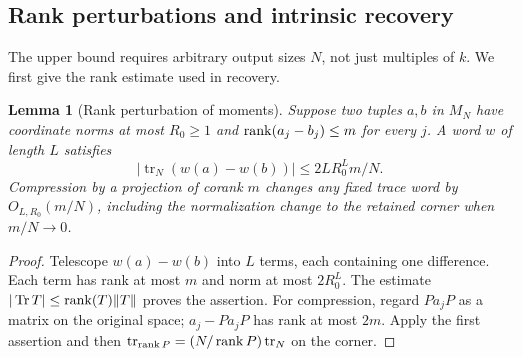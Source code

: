 \documentclass[11pt]{article}
\newtheorem{lemma}[theorem]{Lemma}
\theoremstyle{definition}\newtheorem{definition}[theorem]{Definition}
\theoremstyle{remark}\newtheorem{remark}[theorem]{Remark}
\DeclareMathOperator{\Tr}{Tr}\DeclareMathOperator{\tr}{tr}
\begin{document}
\subsection{Rank perturbations and intrinsic recovery}
The upper bound requires arbitrary output sizes $N$, not just multiples
of $k$. We first give the rank estimate used in recovery.

\begin{lemma}[Rank perturbation of moments]\label{lem:rank}
Suppose two tuples $a,b$ in $M_N$ have coordinate norms at most $R_0\geq1$
and $\operatorname{rank}(a_j-b_j)\leq m$ for every $j$. A word $w$ of length $L$
satisfies
\[
 |\tr_N(w(a)-w(b))|\leq2LR_0^L m/N.
\]
Compression by a projection of corank $m$ changes any fixed trace word
by $O_{L,R_0}(m/N)$, including the normalization change to the retained
corner when $m/N\to0$.
\end{lemma}
\begin{proof}
Telescope $w(a)-w(b)$ into $L$ terms, each containing one difference.
Each term has rank at most $m$ and norm at most $2R_0^L$.
The estimate $|\Tr T|\leq\rank(T)\|T\|$ proves the assertion.
For compression, regard $Pa_jP$ as a matrix on the original space;
$a_j-Pa_jP$ has rank at most $2m$. Apply the first assertion and then
$\tr_{\rank P}=(N/\rank P)\tr_N$ on the corner.
\end{proof}
\end{document}
